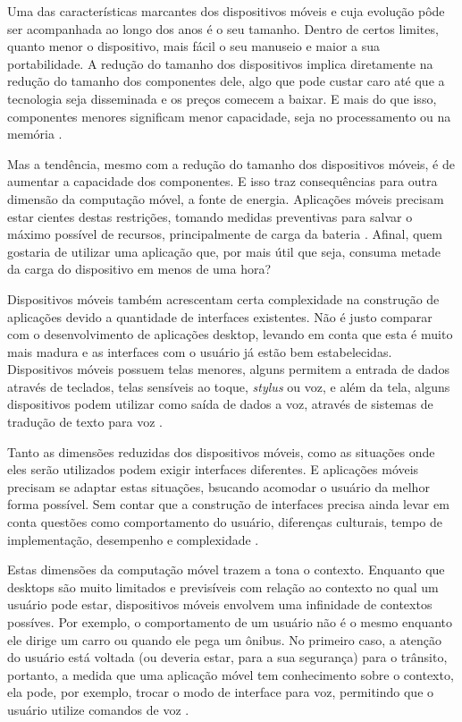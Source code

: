 \documentclass[diss]{template/setrem}
\begin{document}
Uma das características marcantes dos dispositivos móveis e cuja evolução pôde ser acompanhada ao longo dos anos é o seu tamanho. Dentro de certos limites, quanto menor o dispositivo, mais fácil o seu manuseio e maior a sua portabilidade. A redução do tamanho dos dispositivos implica diretamente na redução do tamanho dos componentes dele, algo que pode custar caro até que a tecnologia seja disseminada e os preços comecem a baixar. E mais do que isso, componentes menores significam menor capacidade, seja no processamento ou na memória \citep{BFar2004}.

Mas a tendência, mesmo com a redução do tamanho dos dispositivos móveis, é de aumentar a capacidade dos componentes. E isso traz consequências para outra dimensão da computação móvel, a fonte de energia. Aplicações móveis precisam estar cientes destas restrições, tomando medidas preventivas para salvar o máximo possível de recursos, principalmente de carga da bateria \citep{BFar2004}. Afinal, quem gostaria de utilizar uma aplicação que, por mais útil que seja, consuma metade da carga do dispositivo em menos de uma hora?

Dispositivos móveis também acrescentam certa complexidade na construção de aplicações devido a quantidade de interfaces existentes. Não é justo comparar com o desenvolvimento de aplicações desktop, levando em conta que esta é muito mais madura e as interfaces com o usuário já estão bem estabelecidas. Dispositivos móveis possuem telas menores, alguns permitem a entrada de dados através de teclados, telas sensíveis ao toque, \emph{stylus} ou voz, e além da tela, alguns dispositivos podem utilizar como saída de dados a voz, através de sistemas de tradução de texto para voz \citep{BFar2004}.

Tanto as dimensões reduzidas dos dispositivos móveis, como as situações onde eles serão utilizados podem exigir interfaces diferentes. E aplicações móveis precisam se adaptar estas situações, bsucando acomodar o usuário da melhor forma possível. Sem contar que a construção de interfaces precisa ainda levar em conta questões como comportamento do usuário, diferenças culturais, tempo de implementação, desempenho e complexidade \citep{BFar2004}.

Estas dimensões da computação móvel trazem a tona o contexto. Enquanto que desktops são muito limitados e previsíveis com relação ao contexto no qual um usuário pode estar, dispositivos móveis envolvem uma infinidade de contextos possíves. Por exemplo, o comportamento de um usuário não é o mesmo enquanto ele dirige um carro ou quando ele pega um ônibus. No primeiro caso, a atenção do usuário está voltada (ou deveria estar, para a sua segurança) para o trânsito, portanto, a medida que uma aplicação móvel tem conhecimento sobre o contexto, ela pode, por exemplo, trocar o modo de interface para voz, permitindo que o usuário utilize comandos de voz \citep{Fling2009}.
\end{document}
